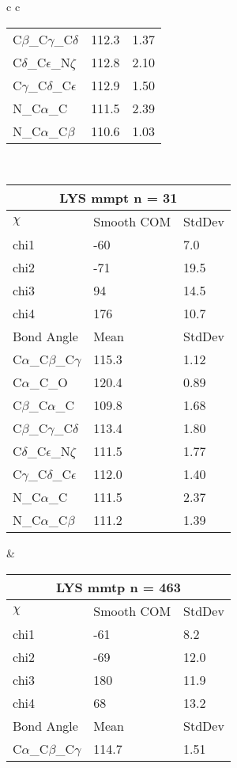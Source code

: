 \begin{longtable}{ c c }
\begin{tabular}{ l l l }
  C$\beta$\_C$\gamma$\_C$\delta$ & 112.3 & 1.37\\
  C$\delta$\_C$\epsilon$\_N$\zeta$ & 112.8 & 2.10\\
  C$\gamma$\_C$\delta$\_C$\epsilon$ & 112.9 & 1.50\\
  N\_C$\alpha$\_C & 111.5 & 2.39\\
  N\_C$\alpha$\_C$\beta$ & 110.6 & 1.03\\
  \bottomrule
  \end{tabular}
  \\
  \begin{tabular}{ l l l }
  \toprule
  \multicolumn{3}{c}{LYS \textbf{mmpt} n = 31} \\ \toprule
  $\chi$       & Smooth COM & StdDev \\ \midrule
  chi1 & -60 & 7.0 \\ 
  chi2 & -71 & 19.5 \\ 
  chi3 & 94 & 14.5 \\ 
  chi4 & 176 & 10.7 \\ \midrule
  Bond Angle   & Mean     & StdDev \\ \midrule
  C$\alpha$\_C$\beta$\_C$\gamma$ & 115.3 & 1.12\\
  C$\alpha$\_C\_O & 120.4 & 0.89\\
  C$\beta$\_C$\alpha$\_C & 109.8 & 1.68\\
  C$\beta$\_C$\gamma$\_C$\delta$ & 113.4 & 1.80\\
  C$\delta$\_C$\epsilon$\_N$\zeta$ & 111.5 & 1.77\\
  C$\gamma$\_C$\delta$\_C$\epsilon$ & 112.0 & 1.40\\
  N\_C$\alpha$\_C & 111.5 & 2.37\\
  N\_C$\alpha$\_C$\beta$ & 111.2 & 1.39\\
  \bottomrule
  \end{tabular}
  &
  \begin{tabular}{ l l l }
  \toprule
  \multicolumn{3}{c}{LYS \textbf{mmtp} n = 463} \\ \toprule
  $\chi$       & Smooth COM & StdDev \\ \midrule
  chi1 & -61 & 8.2 \\ 
  chi2 & -69 & 12.0 \\ 
  chi3 & 180 & 11.9 \\ 
  chi4 & 68 & 13.2 \\ \midrule
  Bond Angle   & Mean     & StdDev \\ \midrule
  C$\alpha$\_C$\beta$\_C$\gamma$ & 114.7 & 1.51\\

\end{tabular}
\end{longtable}
